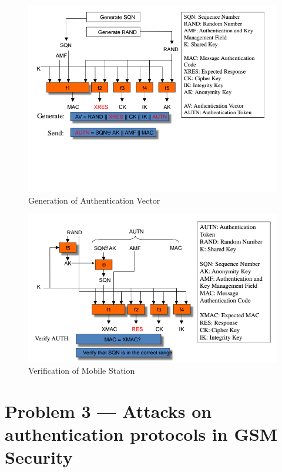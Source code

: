 \documentclass[a4paper]{report}
\begin{document}
\begin{figure}
\begin{mdframed}
\includegraphics[scale=0.2]{Generation_of_Authentication_Vector.png}
\caption{Generation of Authentication Vector}
\label{fig:prob2c2}
\end{mdframed}
\end{figure}

\begin{figure}
\begin{mdframed}
\includegraphics[scale=0.2]{Verification_of_Mobile_Station.png}
\caption{Verification of Mobile Station}
\label{fig:prob2c3}
\end{mdframed}
\end{figure}

\section{Problem 3 --- Attacks on authentication protocols in GSM Security}
\end{document}
